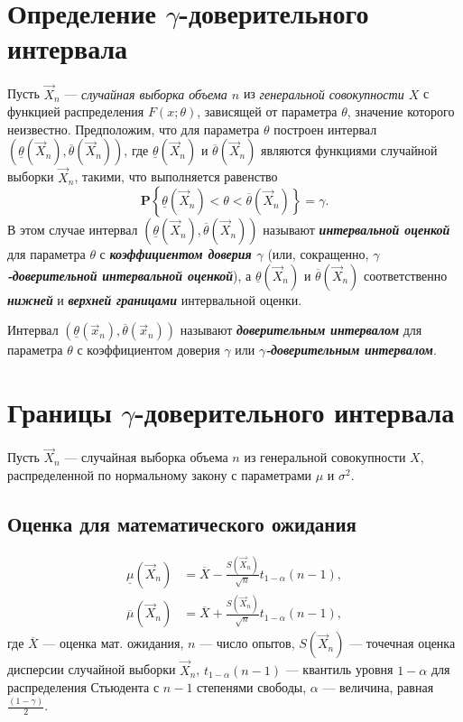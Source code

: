 \documentclass[a4paper,oneside,12pt]{extreport}
\begin{document}
\pagebreak
\section{Определение $\gamma$-доверительного интервала}

Пусть $\vec X_n$ — \textit{случайная выборка объема $n$} из \textit{генеральной совокупности $X$} с функцией распределения $F(x;\theta)$, зависящей от параметра $\theta$, значение которого неизвестно.
Предположим, что для параметра $\theta$ построен интервал $\left(\underline\theta(\vec X_n), \overline\theta(\vec X_n)\right)$, где $\underline\theta(\vec X_n)$ и $\overline\theta(\vec X_n)$ являются функциями случайной выборки $\vec X_n$, такими, что выполняется равенство
\begin{equation}
	\mathbf P \left\{ \underline\theta(\vec X_n) < \theta < \overline\theta(\vec X_n) \right\} = \gamma.
\end{equation}
В этом случае интервал $\left(\underline\theta(\vec X_n), \overline\theta(\vec X_n)\right)$ называют {\itshape\bfseries интервальной оценкой} для параметра $\theta$ с {\itshape\bfseries коэффициентом доверия $\gamma$} (или, сокращенно, {\itshape\bfseries $\gamma$-доверительной интервальной оценкой}), а $\underline\theta(\vec X_n)$ и $\overline\theta(\vec X_n)$ соответственно {\itshape\bfseries нижней} и {\itshape\bfseries верхней границами} интервальной оценки.

Интервал $\left(\underline\theta(\vec x_n), \overline\theta(\vec x_n)\right)$ называют {\itshape\bfseries доверительным интервалом} для параметра $\theta$ с коэффициентом доверия $\gamma$ или {\itshape\bfseries $\gamma$-доверительным интервалом}.

\section{Границы $\gamma$-доверительного интервала}

Пусть $\vec X_n$ — случайная выборка объема $n$ из генеральной совокупности $X$, распределенной по нормальному закону с параметрами $\mu$ и $\sigma^{2}$.

\subsection{Оценка для математического ожидания}

\begin{align}
	\underline\mu(\vec X_n) &= \overline X -\frac{S(\vec X_n)}{\sqrt n}t_{1-\alpha}(n-1),\\
	\overline\mu(\vec X_n)  &= \overline X +\frac{S(\vec X_n)}{\sqrt n}t_{1-\alpha}(n-1),
\end{align}
где $\overline X$ — оценка мат. ожидания, $n$ — число опытов, $S(\vec X_n)$ — точечная оценка дисперсии случайной выборки $\vec X_n$, $t_{1-\alpha}(n-1)$ — квантиль уровня $1-\alpha$ для распределения Стьюдента с $n-1$ степенями свободы, $\alpha$ — величина, равная $\displaystyle \frac{(1-\gamma)}2$.
\end{document}
